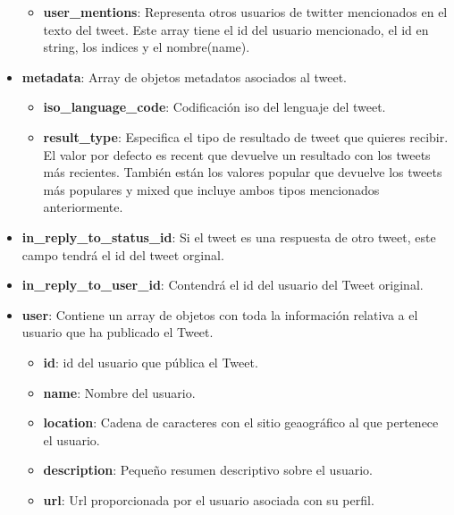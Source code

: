 \begin{itemize}
\begin{itemize}
\item \textbf{user\_mentions}: Representa otros usuarios de twitter mencionados en el texto del tweet. Este array tiene el id del usuario mencionado, el id en string, los indices y el nombre(name).

\end{itemize}


\item \textbf{metadata}: Array de objetos metadatos asociados al tweet.

\begin{itemize}

\item \textbf{iso\_language\_code}: Codificación iso del lenguaje del tweet.

\item \textbf{result\_type}: Especifica el tipo de resultado de tweet que quieres recibir. El valor por defecto es recent que devuelve un resultado con los tweets más recientes. También están los valores popular que devuelve los tweets más populares y mixed que incluye ambos tipos mencionados anteriormente.

\end{itemize}


\item \textbf{in\_reply\_to\_status\_id}: Si el tweet es una respuesta de otro tweet, este campo tendrá el id del tweet orginal.

\item \textbf{in\_reply\_to\_user\_id}: Contendrá el id del usuario del Tweet original.

\item \textbf{user}: Contiene un array de objetos con toda la información relativa a el usuario que ha publicado el Tweet.

\begin{itemize}

\item \textbf{id}: id del usuario que pública el Tweet.

\item \textbf{name}: Nombre del usuario.

\item \textbf{location}: Cadena de caracteres con el sitio geaográfico al que pertenece el usuario.

\item \textbf{description}: Pequeño resumen descriptivo sobre el usuario.

\item \textbf{url}: Url proporcionada por el usuario asociada con su perfil.


\end{itemize}
\end{itemize}
